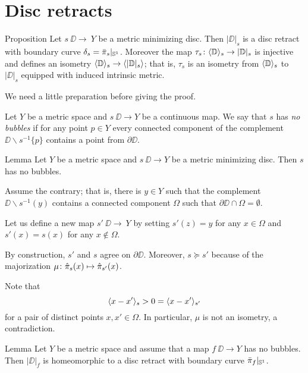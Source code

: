 \section{Disc retracts}\label{Metric minimizing discs}

\begin{thm}{Proposition}\label{prop:|D|}
Let $s\:\DD\to\ Y$ be a metric minimizing disc.
Then $|\DD|_s$ is a disc retract with boundary curve $\delta_s=\bar\pi_s|_{\mathbb{S}^1}$.
Moreover the map $\tau_s\colon\langle\mathbb{D}\rangle_s\to |\mathbb{D}|_s$ is injective and defines an isometry
$\langle\mathbb{D}\rangle_s\to \langle|\mathbb{D}|_s\rangle$;
that is, $\tau_s$ is an isometry from $\langle\mathbb{D}\rangle_s$ to $|\DD|_s$ equipped with induced intrinsic metric.
\end{thm}

We need a little preparation before giving the proof.

Let $Y$ be a metric space and
$s\:\DD\to Y$ be a continuous map.
We say that $s$ has \label{page:no-bubble}\emph{no bubbles}
if for any point $p\in Y$ every connected component of the complement $\DD\backslash s^{-1}\{p\}$ contains a point from $\partial \DD$.

\begin{thm}{Lemma}\label{prop:point-complement}
Let $Y$ be a metric space and $s\:\DD\to Y$ be a metric minimizing disc.
Then $s$ has no bubbles.
\end{thm}

Assume the contrary;
that is, there is $y\in Y$ such that the complement $\DD\backslash s^{-1}(y)$ contains a connected component $\Omega$ 
such that $\partial \DD\cap \Omega=\emptyset$.

Let us define a new map $s'\:\DD\to\ Y$ by setting $s'(z)=y$ for any $x\in \Omega$ and $s'(x)=s(x)$ for any $x\notin \Omega$.

By construction, $s'$ and $s$ agree on $\partial\DD$. Moreover, $s\succcurlyeq s'$
because of the majorization $\mu\:\hat\pi_s(x)\zz\mapsto \hat\pi_{s'}(x)$.

Note that
\[\langle x-x'\rangle_{s}>0=\langle x-x'\rangle_{s'}\]
for a pair of distinct points $x,x'\in \Omega$.
In particular, $\mu$ is not an isometry, a contradiction.
\qeds



\begin{thm}{Lemma}\label{prop:disc-moore}
Let $Y$ be a metric space and assume that a map $f\:\DD\to Y$ has no bubbles.
Then $|\DD|_f$ is homeomorphic to a disc retract with boundary curve $\bar\pi_f|_{\mathbb{S}^1}$.
\end{thm}

